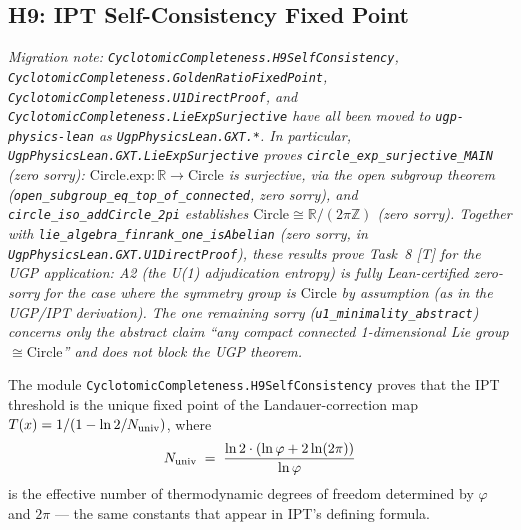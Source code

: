 \documentclass[11pt,a4paper]{article}
\theoremstyle{definition}
\begin{document}
\subsection{H9: IPT Self-Consistency Fixed Point}\label{subsec:h9-self-consistency}

\noindent\textit{Migration note: \texttt{CyclotomicCompleteness.H9SelfConsistency},
\texttt{CyclotomicCompleteness.\allowbreak GoldenRatioFixedPoint},
\texttt{CyclotomicCompleteness.\allowbreak U1DirectProof}, and
\texttt{CyclotomicCompleteness.LieExpSurjective} have all been moved to
\texttt{ugp-physics-lean} as \texttt{UgpPhysicsLean.GXT.*}.
In particular, \texttt{UgpPhysicsLean.GXT.LieExpSurjective} proves
\lstinline|circle_exp_surjective_MAIN| (zero sorry):
$\mathrm{Circle.exp} : \mathbb{R} \to \mathrm{Circle}$ is surjective, via the open
subgroup theorem (\lstinline|open_subgroup_eq_top_of_connected|, zero sorry), and
\lstinline|circle_iso_addCircle_2pi| establishes $\mathrm{Circle} \cong \mathbb{R}/(2\pi\mathbb{Z})$
(zero sorry).  Together with \lstinline|lie_algebra_finrank_one_isAbelian|
(zero sorry, in \texttt{UgpPhysicsLean.GXT.U1DirectProof}), these results prove Task~8
[T] for the UGP application: A2 (the U(1) adjudication entropy) is fully Lean-certified
zero-sorry for the case where the symmetry group is $\mathrm{Circle}$ by assumption
(as in the UGP/IPT derivation).  The one remaining sorry
(\lstinline|u1_minimality_abstract|) concerns only the abstract claim ``any compact
connected 1-dimensional Lie group $\cong \mathrm{Circle}$'' and does not block the UGP
theorem.}

The module \texttt{CyclotomicCompleteness.H9SelfConsistency} proves that the IPT
threshold is the unique fixed point of the Landauer-correction map
$T(x) = 1/(1 - \ln 2 / N_{\rm univ})$, where
\[
  N_{\rm univ} \;=\; \frac{\ln 2 \cdot (\ln\varphi + 2\ln(2\pi))}{\ln\varphi}
\]
is the effective number of thermodynamic degrees of freedom determined by $\varphi$ and
$2\pi$ — the same constants that appear in IPT's defining formula.
\end{document}
